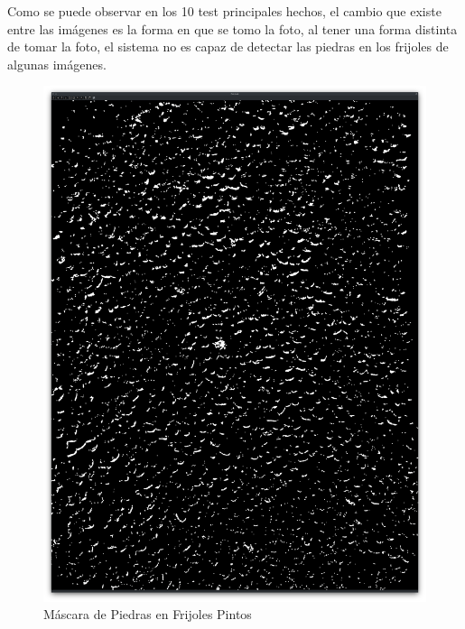\documentclass[conference]{IEEEtran}
\begin{document}
    Como se puede observar en los 10 test principales hechos, el cambio que existe entre las imágenes es la forma en que se tomo la foto, al tener una forma distinta de tomar la foto, el sistema no es capaz de detectar las piedras en los frijoles de algunas imágenes. 

    \begin{figure}[H]
        \centering
        \includegraphics[width=\breite\linewidth]{images/mascara_pintos.png}
        \caption{Máscara de Piedras en Frijoles Pintos}
        \label{fig:mascara_pintos}
    \end{figure}
\end{document}
